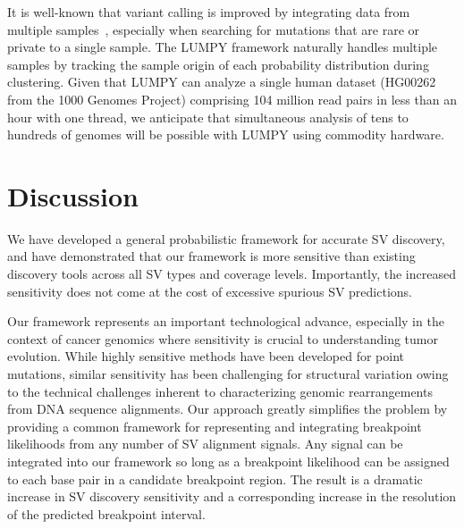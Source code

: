 \documentclass[10pt]{bmc_article}
\newenvironment{bmcformat}{\begin{raggedright}\baselineskip20pt\sloppy\setboolean{publ}{false}}{\end{raggedright}\baselineskip20pt\sloppy}
\begin{document}
\begin{bmcformat}
It is well-known that variant calling is improved by integrating data from
multiple samples~\cite{handsaker2011, mckenna2010, hormozdiari2011,
quinlan2011}, especially when searching for mutations that are rare or private
to a single sample. The LUMPY framework naturally handles multiple samples by
tracking the sample origin of each probability distribution during clustering.
Given that LUMPY can analyze a single human dataset (HG00262 from the 1000
Genomes Project) comprising 104 million read pairs in less than an hour with one
thread, we anticipate that simultaneous analysis of tens to hundreds of genomes
will be possible with LUMPY using commodity hardware.

\section*{Discussion}
We have developed a general probabilistic framework for accurate SV discovery,
and have demonstrated that our framework is more sensitive than existing
discovery tools across all SV types and coverage levels. Importantly, the
increased sensitivity does not come at the cost of excessive spurious SV
predictions.

Our framework represents an important technological advance, especially in the
context of cancer genomics where sensitivity is crucial to understanding tumor
evolution. While highly sensitive methods have been developed for point
mutations, similar sensitivity has been challenging for structural variation
owing to the technical challenges inherent to characterizing genomic
rearrangements from DNA sequence alignments. Our approach greatly simplifies the
problem by providing a common framework for representing and integrating
breakpoint likelihoods from any number of SV alignment signals. Any signal can
be integrated into our framework so long as a breakpoint likelihood can be
assigned to each base pair in a candidate breakpoint region. The result is a
dramatic increase in SV discovery sensitivity and a corresponding increase in
the resolution of the predicted breakpoint interval.


\end{bmcformat}
\end{document}
